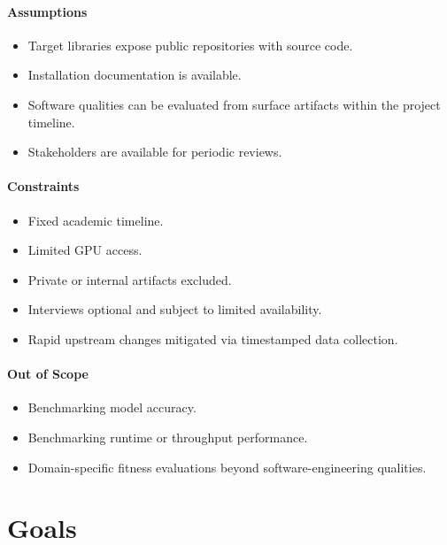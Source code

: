 \documentclass{article}
\begin{document}
\paragraph{Assumptions}
\begin{itemize}
  \item Target libraries expose public repositories with source code.
  \item Installation documentation is available.
  \item Software qualities can be evaluated from surface artifacts within the project timeline.
  \item Stakeholders are available for periodic reviews.
\end{itemize}

\paragraph{Constraints}
\begin{itemize}
  \item Fixed academic timeline.
  \item Limited GPU access.
  \item Private or internal artifacts excluded.
  \item Interviews optional and subject to limited availability.
  \item Rapid upstream changes mitigated via timestamped data collection.
\end{itemize}

\paragraph{Out of Scope}
\begin{itemize}
  \item Benchmarking model accuracy.
  \item Benchmarking runtime or throughput performance.
  \item Domain-specific fitness evaluations beyond software-engineering qualities.
\end{itemize}


\section{Goals}
\end{document}
